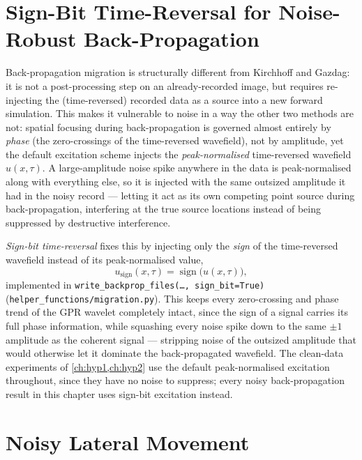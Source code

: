 \section{Sign-Bit Time-Reversal for Noise-Robust Back-Propagation}
\label{sec:hyp3-signbit}

Back-propagation migration is structurally different from Kirchhoff and
Gazdag: it is not a post-processing step on an already-recorded image, but
requires re-injecting the (time-reversed) recorded data as a source into a
new forward simulation. This makes it vulnerable to noise in a way the
other two methods are not: spatial focusing during back-propagation is
governed almost entirely by \emph{phase} (the zero-crossings of the
time-reversed wavefield), not by amplitude, yet the default excitation
scheme injects the \emph{peak-normalised} time-reversed wavefield
$u(x,\tau)$. A large-amplitude noise spike anywhere in the data is peak-normalised
along with everything else, so it is injected with the same outsized
amplitude it had in the noisy record --- letting it act as its own
competing point source during back-propagation, interfering at the true
source locations instead of being suppressed by destructive interference.

\emph{Sign-bit time-reversal} fixes this by injecting only the
\emph{sign} of the time-reversed wavefield instead of its peak-normalised
value,
\begin{equation}
  u_{\mathrm{sign}}(x,\tau) = \operatorname{sign}\bigl(u(x,\tau)\bigr) ,
  \label{eq:signbit}
\end{equation}
implemented in \texttt{write\_backprop\_files(\ldots, sign\_bit=True)}
(\texttt{helper\_functions/migration.py}). This keeps every zero-crossing
and phase trend of the GPR wavelet completely intact, since the sign of a
signal carries its full phase information, while squashing every noise
spike down to the same $\pm1$ amplitude as the coherent signal --- stripping
noise of the outsized amplitude that would otherwise let it dominate the
back-propagated wavefield. The clean-data experiments of \cref{ch:hyp1,ch:hyp2}
use the default peak-normalised excitation throughout, since they have no
noise to suppress; every noisy back-propagation result in this chapter uses
sign-bit excitation instead.

\section{Noisy Lateral Movement}
\label{sec:hyp3-lateral}
\label{sec:tl-noise}

